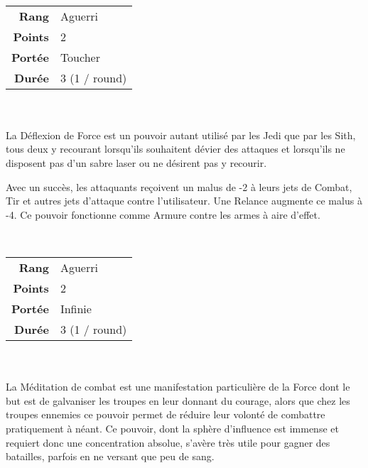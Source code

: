 \begin{description}[align=left] 

    \item [Déflexion de Force] ~ \\

        \begin{tabular}{ r l }
            \textbf{Rang}    & Aguerri \\
            \textbf{Points}  & 2 \\
            \textbf{Portée}  & Toucher \\
            \textbf{Durée}   & 3 (1 / round) \\
        \end{tabular}
        \\ \\
        La Déflexion de Force est un pouvoir autant utilisé par les Jedi que par les Sith, tous deux y recourant lorsqu’ils souhaitent dévier des attaques et lorsqu’ils ne disposent pas d’un sabre laser ou ne désirent pas y recourir.

        Avec un succès, les attaquants reçoivent un malus de -2 à leurs jets de Combat, Tir et autres jets d’attaque contre l’utilisateur. Une Relance augmente ce malus à -4. Ce pouvoir fonctionne comme Armure contre les armes à aire d’effet.
        \\

    \item [Méditation de Combat] ~ \\

        \begin{tabular}{ r l }
            \textbf{Rang}    & Aguerri \\
            \textbf{Points}  & 2 \\
            \textbf{Portée}  & Infinie \\
            \textbf{Durée}   & 3 (1 / round) \\
        \end{tabular}
        \\ \\
        La Méditation de combat est une manifestation particulière de la Force dont le but est de galvaniser les troupes en leur donnant du courage, alors que chez les troupes ennemies ce pouvoir permet de réduire leur volonté de combattre pratiquement à néant. Ce pouvoir, dont la sphère d’influence est immense et requiert donc une concentration absolue, s’avère très utile pour gagner des batailles, parfois en ne versant que peu de sang.


\end{description}
